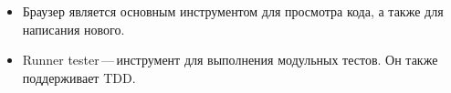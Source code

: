 \documentclass[a4paper,10pt,twoside]{book}
\begin{document}
\begin{itemize}
\item Браузер является основным инструментом для просмотра кода,
а также для написания нового.

\item Runner tester\,---\,инструмент для выполнения модульных тестов.
Он также поддерживает TDD.
\end{itemize}

\ifx\wholebook\relax\else 
   
   
\end{document}
